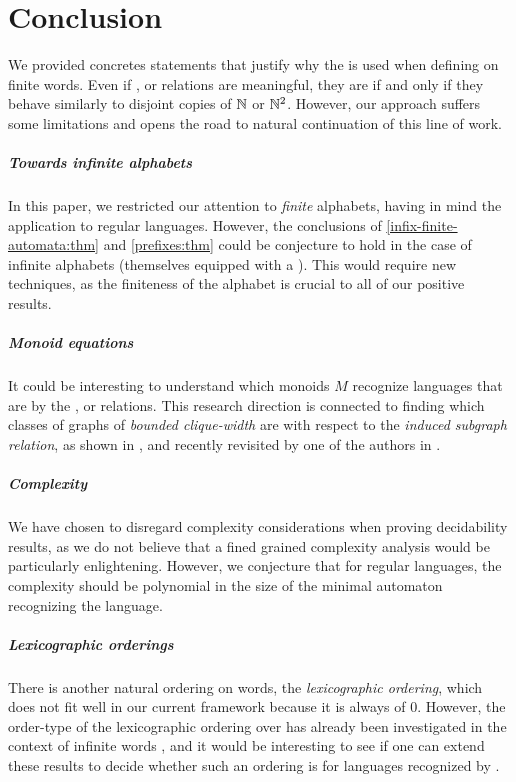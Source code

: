 \section{Conclusion}
\label{conclusion:sec}

We provided concretes statements that justify why the 
is used when defining  on finite words. Even if
,  or  relations are meaningful, they are
 if and only if they behave similarly to disjoint copies
of $\mathbb{N}$ or $\mathbb{N}^2$. However, our approach suffers some limitations 
and opens the road to natural continuation of this line of work.

\subparagraph{Towards infinite alphabets} In this paper, we restricted our
attention to \emph{finite} alphabets, having in mind the application to regular
languages. However, the conclusions of \cref{infix-finite-automata:thm} and
\cref{prefixes:thm} could be conjecture to hold in the case of infinite
alphabets (themselves equipped with a ). This would
require new techniques, as the finiteness of the alphabet is crucial to all of
our positive results.

\subparagraph{Monoid equations}  It could be interesting to understand which
monoids $M$ recognize languages that are  by the
,  or  relations. This research direction is
connected to finding which classes of graphs of \emph{bounded clique-width} are
 with respect to the \emph{induced subgraph relation},
as shown in \cite{DRT10}, and recently revisited by one of the authors in
\cite{L24:arxiv:v2}.

\subparagraph{Complexity} We have chosen to disregard complexity considerations
when proving decidability results, as we do not believe that a fined grained
complexity analysis would be particularly enlightening. However, we conjecture
that for regular languages, the complexity should be polynomial in the size of
the minimal automaton recognizing the language.


\subparagraph{Lexicographic orderings} There is another natural ordering on
words, the \emph{lexicographic ordering}, which does not fit well in our
current framework because it is always of  $0$. However, the
order-type of the lexicographic ordering over  has
already been investigated in the context of infinite words \cite{CACOPU18}, and
it would be interesting to see if one can extend these results to decide
whether such an ordering is  for languages recognized by
.
